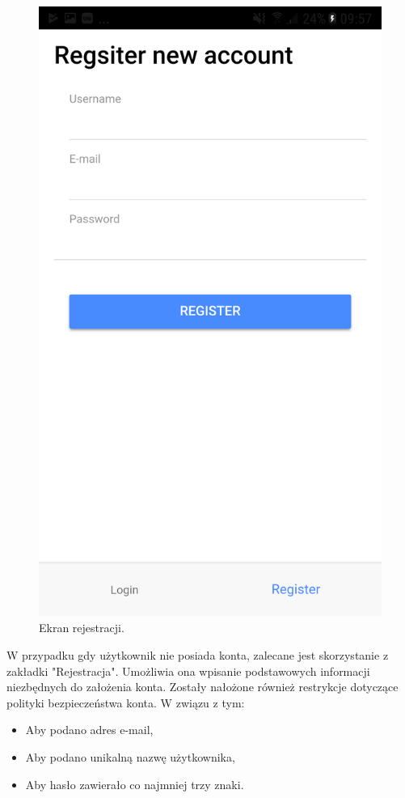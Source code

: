 {\begin{figure}
	\centering
	\includegraphics[width=0.8\linewidth]{images/register_page}
	\caption{Ekran rejestracji.}
	\label{fig:registerpage}
\end{figure}
W przypadku gdy użytkownik nie posiada konta, zalecane jest skorzystanie z zakładki "Rejestracja". Umożliwia ona wpisanie podstawowych informacji niezbędnych do założenia konta. Zostały nałożone również restrykcje dotyczące polityki bezpieczeństwa konta. W związu z tym:
\begin{itemize}[noitemsep]
	\item Aby podano adres e-mail,
	\item Aby podano unikalną nazwę użytkownika,
	\item Aby hasło zawierało co najmniej trzy znaki.
\end{itemize} 
}
\newpage
